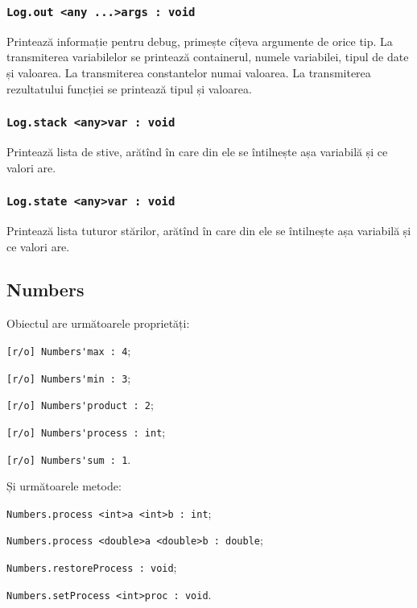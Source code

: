 \subsubsection{\lstinline|Log.out <any ...>args : void|}

Printează informație pentru debug, primește cîțeva argumente de orice tip. La transmiterea variabilelor se printează containerul, numele variabilei, tipul de date și valoarea. La transmiterea constantelor numai valoarea. La transmiterea rezultatului funcției se printează tipul și valoarea.

\subsubsection{\lstinline|Log.stack <any>var : void|}

Printează lista de stive, arătînd în care din ele se întilnește așa variabilă și ce valori are.

\subsubsection{\lstinline|Log.state <any>var : void|}

Printează lista tuturor stărilor, arătînd în care din ele se întilnește așa variabilă și ce valori are.

\subsection{{\color{orange} Numbers}}

Obiectul \numbers{} are următoarele proprietăți:
\begin{icItems}
	\item \lstinline|[r/o] Numbers'max : 4|;
	\item \lstinline|[r/o] Numbers'min : 3|;
	\item \lstinline|[r/o] Numbers'product : 2|;
	\item \lstinline|[r/o] Numbers'process : int|;
	\item \lstinline|[r/o] Numbers'sum : 1|.
\end{icItems}

Și următoarele metode:
\begin{icItems}
	\item \lstinline|Numbers.process <int>a <int>b : int|;
	\item \lstinline|Numbers.process <double>a <double>b : double|;
	\item \lstinline|Numbers.restoreProcess : void|;
	\item \lstinline|Numbers.setProcess <int>proc : void|.
\end{icItems}

